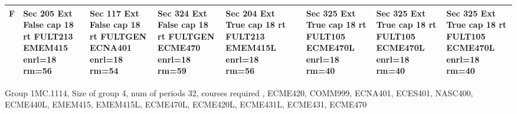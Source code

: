 \documentclass{article} \usepackage[margin=0.5in]{geometry}
\newcommand{\textgr}[1]{\cellcolor{gray!40}\textbf{#1}}
\begin{document}
\begin{tabular}{|c|z|z|z|z|z|z|z|z|}
\hline
\textgr{F} &  Sec 205 Ext False cap 18 rt FULT213 EMEM415 enrl=18 rm=56 & Sec 117 Ext False cap 18 rt FULTGEN ECNA401 enrl=18 rm=54 & Sec 324 Ext False cap 18 rt FULTGEN ECME470 enrl=18 rm=59 & Sec 204 Ext True cap 18 rt FULT213 EMEM415L enrl=18 rm=56 &  & Sec 325 Ext True cap 18 rt FULT105 ECME470L enrl=18 rm=40 & Sec 325 Ext True cap 18 rt FULT105 ECME470L enrl=18 rm=40 & Sec 325 Ext True cap 18 rt FULT105 ECME470L enrl=18 rm=40 \\[65pt]
\hline
\end{tabular}

	
Group 1MC.1114, Size of group  4, num of periods 32, courses required , ECME420, COMM999, ECNA401, ECES401, NASC400, ECME440L, EMEM415, EMEM415L, ECME470L, ECME420L, ECME431L, ECME431, ECME470 
\newpage
	
\end{document}
